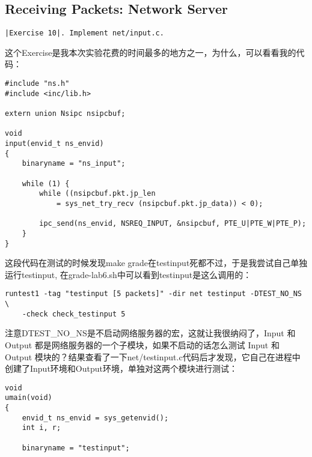 \documentclass{article}
\begin{document}
\begin{CJK*}{UTF8}{gkai}
\vspace{1em}

\subsection{Receiving Packets: Network Server}

\vspace{1em}


\begin{lstlisting}[style=exercise]
|Exercise 10|. Implement net/input.c.
\end{lstlisting}

\vspace{1em}

这个Exercise是我本次实验花费的时间最多的地方之一，为什么，可以看看我的代码：

\begin{lstlisting}[style=ccode, title={\scriptsize \ttfamily \bfseries net/input.c}]
#include "ns.h"
#include <inc/lib.h>

extern union Nsipc nsipcbuf;

void
input(envid_t ns_envid)
{
    binaryname = "ns_input";

    while (1) {
        while ((nsipcbuf.pkt.jp_len 
            = sys_net_try_recv (nsipcbuf.pkt.jp_data)) < 0);

        ipc_send(ns_envid, NSREQ_INPUT, &nsipcbuf, PTE_U|PTE_W|PTE_P);     
    }
}
\end{lstlisting}

这段代码在测试的时候发现make grade在testinput死都不过，于是我尝试自己单独运行testinput, 在grade-lab6.sh中可以看到testinput是这么调用的：

\begin{lstlisting}[style=console]
runtest1 -tag "testinput [5 packets]" -dir net testinput -DTEST_NO_NS \
	-check check_testinput 5
\end{lstlisting}

注意DTEST\_NO\_NS是不启动网络服务器的宏，这就让我很纳闷了，Input 和 Output 都是网络服务器的一个子模块，如果不启动的话怎么测试 Input 和 Output 模块的？结果查看了一下net/testinput.c代码后才发现，它自己在进程中创建了Input环境和Output环境，单独对这两个模块进行测试：

\begin{lstlisting}[style=ccode, title={\scriptsize \ttfamily \bfseries net/testinput.c: umain()}]
void
umain(void)
{
	envid_t ns_envid = sys_getenvid();
	int i, r;

	binaryname = "testinput";


\end{lstlisting}
\end{CJK*}
\end{document}
